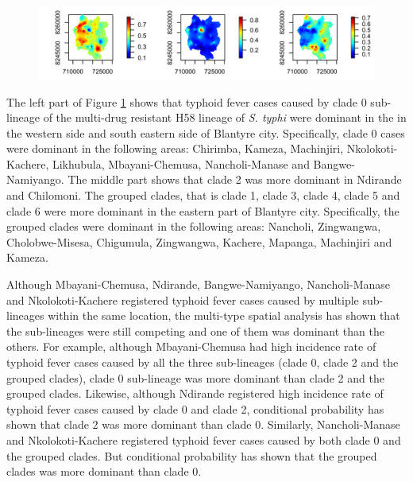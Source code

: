 \begin{figure}[H]
    \begin{center}
        \includegraphics[scale=0.95]{Conditional probability - Multi-type.png}
    \end{center}
     \label{fig:conditional-probability-multi-type}
\end{figure}

The left part of Figure \ref{fig:conditional-probability-multi-type} shows that typhoid fever cases caused by clade 0 sub-lineage of the multi-drug resistant H58 lineage of \textit{S. typhi} were dominant in the in the western side and south eastern side of Blantyre city. Specifically, clade 0 cases were dominant in the following areas: Chirimba, Kameza, Machinjiri, Nkolokoti-Kachere, Likhubula, Mbayani-Chemusa, Nancholi-Manase and Bangwe-Namiyango. The middle part shows that clade 2 was more dominant in Ndirande and Chilomoni. The grouped clades, that is clade 1, clade 3, clade 4, clade 5 and clade 6 were more dominant in the eastern part of Blantyre city. Specifically, the grouped clades were dominant in the following areas: Nancholi, Zingwangwa, Cholobwe-Misesa, Chigumula, Zingwangwa, Kachere, Mapanga, Machinjiri and Kameza.

Although Mbayani-Chemusa, Ndirande, Bangwe-Namiyango,  Nancholi-Manase and Nkolokoti-Kachere registered typhoid fever cases caused by multiple sub-lineages within the same location, the multi-type spatial analysis has shown that the sub-lineages were still competing and one of them was dominant than the others. For example, although Mbayani-Chemusa had high incidence rate of typhoid fever cases caused by all the three sub-lineages (clade 0, clade 2 and the grouped clades), clade 0 sub-lineage was more dominant than clade 2 and the grouped clades. Likewise, although Ndirande registered high incidence rate of typhoid fever cases caused by clade 0 and clade 2, conditional probability has shown that clade 2 was more dominant than clade 0. Similarly, Nancholi-Manase and Nkolokoti-Kachere registered typhoid fever cases caused by both clade 0 and the grouped clades. But conditional probability has shown that the grouped clades was more dominant than clade 0.

